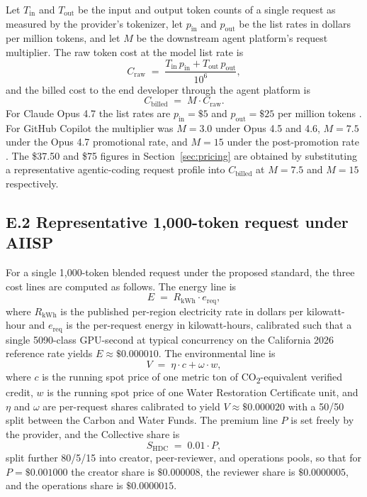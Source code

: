 \documentclass[10pt,a4paper,twocolumn]{article}
\begin{document}
Let $T_{\mathrm{in}}$ and $T_{\mathrm{out}}$ be the input and output token counts of a single request as measured by the provider's tokenizer, let $p_{\mathrm{in}}$ and $p_{\mathrm{out}}$ be the list rates in dollars per million tokens, and let $M$ be the downstream agent platform's request multiplier. The raw token cost at the model list rate is
\[
C_{\mathrm{raw}} \;=\; \frac{T_{\mathrm{in}}\,p_{\mathrm{in}} + T_{\mathrm{out}}\,p_{\mathrm{out}}}{10^{6}},
\]
and the billed cost to the end developer through the agent platform is
\[
C_{\mathrm{billed}} \;=\; M \cdot C_{\mathrm{raw}}.
\]
For Claude Opus 4.7 the list rates are $p_{\mathrm{in}} = \$5$ and $p_{\mathrm{out}} = \$25$ per million tokens \citep{anthropic2026opus47}. For GitHub Copilot the multiplier was $M = 3.0$ under Opus 4.5 and 4.6, $M = 7.5$ under the Opus 4.7 promotional rate, and $M = 15$ under the post-promotion rate \citep{github2026opus47,vscode2026opus47issue}. The \$37.50 and \$75 figures in Section~\ref{sec:pricing} are obtained by substituting a representative agentic-coding request profile into $C_{\mathrm{billed}}$ at $M = 7.5$ and $M = 15$ respectively.

\subsection*{E.2 Representative 1{,}000-token request under AIISP}

For a single 1{,}000-token blended request under the proposed standard, the three cost lines are computed as follows. The energy line is
\[
E \;=\; R_{\mathrm{kWh}} \cdot e_{\mathrm{req}},
\]
where $R_{\mathrm{kWh}}$ is the published per-region electricity rate in dollars per kilowatt-hour and $e_{\mathrm{req}}$ is the per-request energy in kilowatt-hours, calibrated such that a single 5090-class GPU-second at typical concurrency on the California 2026 reference rate yields $E \approx \$0.000010$. The environmental line is
\[
V \;=\; \eta \cdot c + \omega \cdot w,
\]
where $c$ is the running spot price of one metric ton of CO\textsubscript{2}-equivalent verified credit, $w$ is the running spot price of one Water Restoration Certificate unit, and $\eta$ and $\omega$ are per-request shares calibrated to yield $V \approx \$0.000020$ with a 50/50 split between the Carbon and Water Funds. The premium line $P$ is set freely by the provider, and the Collective share is
\[
S_{\mathrm{HDC}} \;=\; 0.01 \cdot P,
\]
split further 80/5/15 into creator, peer-reviewer, and operations pools, so that for $P = \$0.001000$ the creator share is $\$0.000008$, the reviewer share is $\$0.0000005$, and the operations share is $\$0.0000015$.
\end{document}
